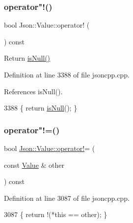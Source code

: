 \subsubsection{\texorpdfstring{operator"!()}{operator!()}}
{\footnotesize\ttfamily bool Json\+::\+Value\+::operator! (\begin{DoxyParamCaption}{ }\end{DoxyParamCaption}) const}



Return \hyperlink{class_json_1_1_value_abde4070e21e46dc4f8203f66582cb19f}{is\+Null()} 



Definition at line 3388 of file jsoncpp.\+cpp.



References is\+Null().


\begin{DoxyCode}
3388 \{ \textcolor{keywordflow}{return} \hyperlink{class_json_1_1_value_abde4070e21e46dc4f8203f66582cb19f}{isNull}(); \}
\end{DoxyCode}
\mbox{\label{class_json_1_1_value_a86e95be072e515c48abc61dec63a1689}} 
\subsubsection{\texorpdfstring{operator"!=()}{operator!=()}}
{\footnotesize\ttfamily bool \hyperlink{class_json_1_1_value_a731b89fb4764c39ce2328e1707c822b9}{Json\+::\+Value\+::operator!}= (\begin{DoxyParamCaption}\item[{const \hyperlink{class_json_1_1_value}{Value} \&}]{other }\end{DoxyParamCaption}) const}



Definition at line 3087 of file jsoncpp.\+cpp.


\begin{DoxyCode}
3087 \{ \textcolor{keywordflow}{return} !(*\textcolor{keyword}{this} == other); \}
\end{DoxyCode}
\mbox{\label{class_json_1_1_value_aac6bd14155b88ed2d39ef54820b39e49}} 
